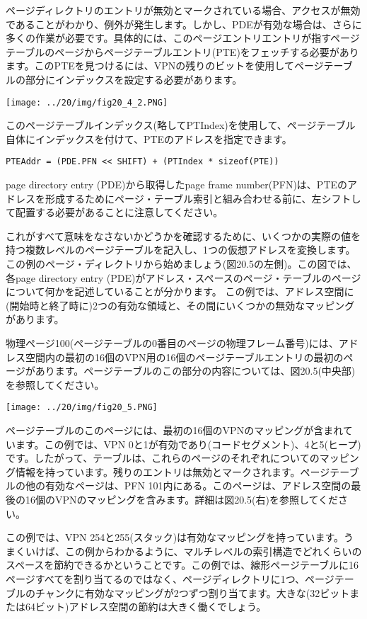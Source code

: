 ページディレクトリのエントリが無効とマークされている場合、アクセスが無効であることがわかり、例外が発生します。しかし、PDEが有効な場合は、さらに多くの作業が必要です。具体的には、このページエントリエントリが指すページテーブルのページからページテーブルエントリ(PTE)をフェッチする必要があります。このPTEを見つけるには、VPNの残りのビットを使用してページテーブルの部分にインデックスを設定する必要があります。

\texttt{[image: ../20/img/fig20\_4\_2.PNG]}

このページテーブルインデックス(略してPTIndex)を使用して、ページテーブル自体にインデックスを付けて、PTEのアドレスを指定できます。

\begin{verbatim}
PTEAddr = (PDE.PFN << SHIFT) + (PTIndex * sizeof(PTE))
\end{verbatim}

page directory entry (PDE)から取得したpage frame
number(PFN)は、PTEのアドレスを形成するためにページ・テーブル索引と組み合わせる前に、左シフトして配置する必要があることに注意してください。

これがすべて意味をなさないかどうかを確認するために、いくつかの実際の値を持つ複数レベルのページテーブルを記入し、1つの仮想アドレスを変換します。この例のページ・ディレクトリから始めましょう(図20.5の左側)。この図では、各page
directory entry
(PDE)がアドレス・スペースのページ・テーブルのページについて何かを記述していることが分かります。
この例では、アドレス空間に(開始時と終了時に)2つの有効な領域と、その間にいくつかの無効なマッピングがあります。

物理ページ100(ページテーブルの0番目のページの物理フレーム番号)には、アドレス空間内の最初の16個のVPN用の16個のページテーブルエントリの最初のページがあります。ページテーブルのこの部分の内容については、図20.5(中央部)を参照してください。

\texttt{[image: ../20/img/fig20\_5.PNG]}

ページテーブルのこのページには、最初の16個のVPNのマッピングが含まれています。この例では、VPN
0と1が有効であり(コードセグメント)、4と5(ヒープ)です。したがって、テーブルは、これらのページのそれぞれについてのマッピング情報を持っています。残りのエントリは無効とマークされます。ページテーブルの他の有効なページは、PFN
101内にある。このページは、アドレス空間の最後の16個のVPNのマッピングを含みます。詳細は図20.5(右)を参照してください。

この例では、VPN
254と255(スタック)は有効なマッピングを持っています。うまくいけば、この例からわかるように、マルチレベルの索引構造でどれくらいのスペースを節約できるかということです。この例では、線形ページテーブルに16ページすべてを割り当てるのではなく、ページディレクトリに1つ、ページテーブルのチャンクに有効なマッピングが2つずつ割り当てます。大きな(32ビットまたは64ビット)アドレス空間の節約は大きく働くでしょう。

